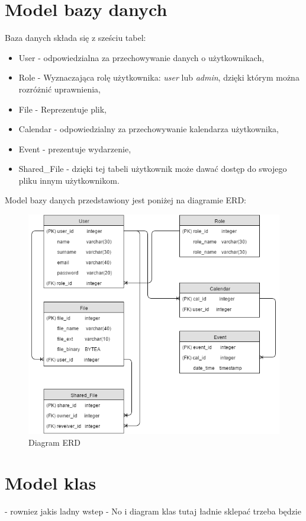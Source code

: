 \section{Model bazy danych}
\label{sec:bd}
Baza danych składa się z sześciu tabel:
\begin{itemize}
	\item User - odpowiedzialna za przechowywanie danych o użytkownikach,
	\item Role - Wyznaczająca rolę użytkownika: \textit{user} lub \textit{admin}, dzięki którym można rozróżnić uprawnienia,
	\item File - Reprezentuje plik,
	\item Calendar - odpowiedzialny za przechowywanie kalendarza użytkownika,
	\item Event - prezentuje wydarzenie,
	\item Shared\_File - dzięki tej tabeli użytkownik może dawać dostęp do swojego pliku innym użytkownikom.
\end{itemize}
Model bazy danych przedstawiony jest poniżej na diagramie ERD:
\begin{figure}[H]
\centering
\includegraphics[scale=0.5]{ERD}
\caption{\label{fig:diag_02}Diagram ERD}
\end{figure}

\section{Model klas}
- rowniez jakis ladny wstep \newline
- No i diagram klas tutaj ładnie sklepać trzeba będzie \newline

